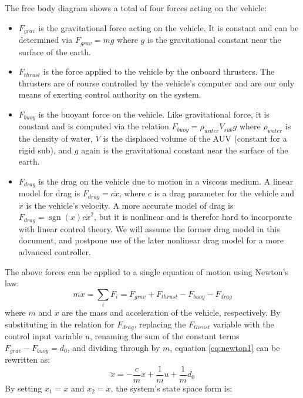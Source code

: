 \documentclass{article}
\begin{document}
The free body diagram shows a total of four forces acting on the vehicle: 
\begin{itemize}
\item $F_{grav}$ is the gravitational force acting on the vehicle.  It is constant and can be determined via $F_{grav}=mg$ where $g$ is the gravitational constant near the surface of the earth.
\item $F_{thrust}$ is the force applied to the vehicle by the onboard thrusters.  The thrusters are of course controlled by the vehicle's computer and are our only means of exerting control authority on the system.
\item $F_{buoy}$ is the buoyant force on the vehicle.  Like gravitational force, it is constant and is computed via the relation $F_{buoy}=\rho_{water}V_{sub}g$ where $\rho_{water}$ is the density of water, $V$ is the displaced volume of the AUV (constant for a rigid sub), and $g$ again is the gravitational constant near the surface of the earth.
\item $F_{drag}$ is the drag on the vehicle due to motion in a viscous medium.  A linear model for drag is $F_{drag}=c\dot{x}$, where $c$ is a drag parameter for the vehicle and $\dot{x}$ is the vehicle's velocity.  A more accurate model of drag is $F_{drag}=\operatorname{sgn}(x)c\dot{x}^{2}$, but it is nonlinear and is therefor hard to incorporate with linear control theory.  We will assume the former drag model in this document, and postpone use of the later nonlinear drag model for a more advanced controller.
\end{itemize}
The above forces can be applied to a single equation of motion using Newton's law:  
\begin{equation}
\label{eq:newton1}
m\ddot{x}=\sum_{i}F_i=F_{grav}+F_{thrust}-F_{buoy}-F_{drag}
\end{equation}
where $m$ and $\ddot{x}$ are the mass and acceleration of the vehicle, respectively.  By substituting in the relation for $F_{drag}$, replacing the $F_{thrust}$ variable with the control input variable $u$, renaming the sum of the constant terms $F_{grav}-F_{buoy}=d_0$, and dividing through by $m$, equation \ref{eq:newton1} can be rewritten as:
\begin{equation}
\ddot{x}=-\frac{c}{m}\dot{x}+\frac{1}{m}u+\frac{1}{m}d_0
\end{equation}
By setting $x_1=x$ and $x_2=\dot{x}$, the system's state space form is:
\end{document}
